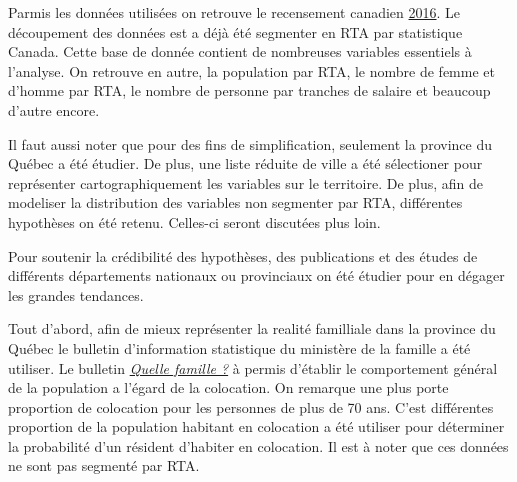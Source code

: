 \documentclass[11pt,french]{report}\usepackage[]{graphicx}\usepackage[]{color}
\begin{document}
Parmis les données utilisées on retrouve le recensement canadien \href{http://www12.statcan.gc.ca/census-recensement/2016/dp-pd/prof/details/download-telecharger/comp/page_dl-tc.cfm?Lang=F}{2016}. Le découpement des données est a déjà été segmenter en RTA par statistique Canada. Cette base de donnée contient de nombreuses variables essentiels à l'analyse. On retrouve en autre, la population par RTA, le nombre de femme et d'homme par RTA, le nombre de personne par tranches de salaire et beaucoup d'autre encore. 
\newline

Il faut aussi noter que pour des fins de simplification, seulement la province du Québec a été étudier. De plus, une liste réduite de ville a été sélectioner pour représenter cartographiquement les variables sur le territoire. De plus, afin de modeliser la distribution des variables non segmenter par RTA, différentes hypothèses on été retenu. Celles-ci seront discutées plus loin. 
\newline

Pour soutenir la crédibilité des hypothèses, des publications et des études de différents départements nationaux ou provinciaux on été étudier pour en dégager les grandes tendances. 
\newline

Tout d'abord, afin de mieux représenter la realité familliale dans la province du Québec le bulletin d'information statistique du ministère de la famille a été utiliser. Le bulletin \href{https://www.mfa.gouv.qc.ca/fr/Famille/chiffres-famille-quebec/bulletin_quelle_famille/Pages/aut2013_no1_tab4.aspx}{\emph{Quelle famille ?}} à permis d'établir le comportement général de la population a l'égard de la colocation. On remarque une plus porte proportion de colocation pour les personnes de plus de 70 ans. C'est différentes proportion de la population habitant en colocation a été utiliser pour déterminer la probabilité d'un résident d'habiter en colocation. Il est à noter que ces données ne sont pas segmenté par RTA.
\newline
\end{document}
